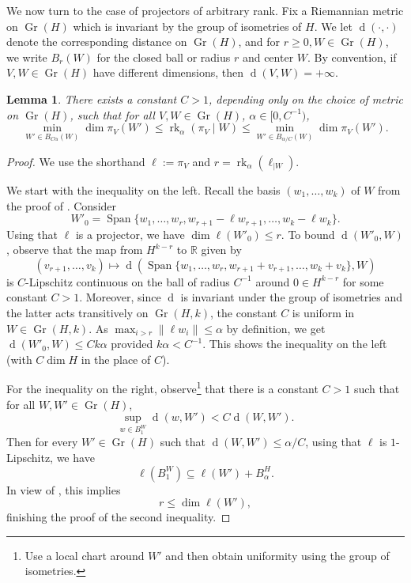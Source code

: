 \documentclass[a4paper,english]{amsart}
\newtheorem{lemma}[thm]{Lemma}
\theoremstyle{definition}
\newcommand{\R}{\mathbb{R}}
\newcommand{\1}{\mathbbm{1}}
\DeclareMathOperator{\Span}{Span}
\DeclareMathOperator{\dist}{d}
\DeclareMathOperator{\rk}{rk}
\DeclareMathOperator{\Gr}{Gr}
\renewcommand{\subset}{\subseteq}
\begin{document}
We now turn to the case of projectors of arbitrary rank.
 Fix a Riemannian metric on $\Gr(H)$ which is invariant by the group of isometries of $H$.
We let $\dist(\cdot, \cdot)$ denote the corresponding distance on $\Gr(H)$, and for $r\geq0, W\in \Gr(H)$, we write $B_{r}(W)$ for the closed ball or radius $r$ and center $W$.
By convention, if $V, W \in \Gr(H)$ have different dimensions, then $\dist(V,W) = +\infty$.

\begin{lemma} \label{eq:comp sR}
There exists a constant $C>1$, depending only on the choice of  metric on $\Gr(H)$, such that for all $V,W \in \Gr(H)$, $\alpha \in [0,C^{-1})$,
\begin{equation}
\min_{W' \in B_{C\alpha}(W) } \dim \pi_{V}(W')
\leq
\rk_\alpha(\pi_{V} \mid W)
\leq \min_{W' \in B_{ \alpha/C}(W) } \dim \pi_{V}(W').
\end{equation}
\end{lemma}




\begin{proof}
We use the shorthand $\ell := \pi_{V}$ and $r=\rk_{\alpha}(\ell_{|W})$.




We start with the inequality on the left. Recall the basis $(w_{1}, \dots, w_{k})$ of $W$ from the proof of .
Consider
\[
W'_{0} = \Span\{w_1, \dotsc, w_r, w_{r+1} - \ell w_{r+1}, \dotsc, w_k - \ell w_k \}.
\]
Using that $\ell$ is a projector, we have $ \dim \ell (W'_{0})\leq r$.
To bound $\dist(W'_{0},W)$, observe that the map from $H^{k - r}$ to $\R$ given by
\[
(v_{r+1}, \dotsc, v_k) \mapsto \dist(\Span\{w_1, \dotsc, w_r, w_{r+1} + v_{r+1}, \dotsc, w_k + v_k\}, W)
\]
is $C$-Lipschitz continuous on the ball of radius $C^{-1}$ around $0 \in H^{k-r}$ for some constant $C > 1$.
Moreover, since $\dist$ is invariant under the group of isometries and the latter acts transitively on $\Gr(H,k)$, the constant $C$ is uniform in $W \in \Gr(H,k)$.
As $\max_{i>r}\|\ell w_{i}\|\leq \alpha$ by definition,   we get  $\dist(W'_{0},W) \leq  C k\alpha$ provided $k\alpha<C^{-1}$.  This shows the  inequality on the left (with $C\dim H$ in the place of $C$).

For the  inequality on the right, observe\footnote{Use a local chart around $W'$ and then obtain uniformity using the group of isometries.} that there is a constant $C>1$ such that
for all $W, W' \in \Gr(H)$,
\[
\sup_{w \in B_1^W} \dist(w,W') < C \dist(W,W').
\]
Then for every $W' \in \Gr(H)$ such that $\dist(W,W') \leq \alpha/C$, using that $\ell$ is $1$-Lipschitz, we have
\[
\ell(B_1^W) \subset \ell(W') + B^{H}_{\alpha}.
\]
In view of , this implies
\[
r\leq \dim \ell(W'),
\]
finishing the proof of the second inequality.
\end{proof}
\end{document}
